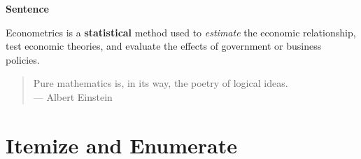 \documentclass[12pt, aspectratio=169]{beamer}
\begin{document}

\linespread{1}  %
\begin{frame}{\textbf{Sentence}}
\linespread{1.5} %
	
	 \alert{Econometrics} is a \textbf{statistical} method used to \textit{estimate} the economic relationship,
	 test economic theories, and evaluate the effects of government or business policies.
	 
	 \pause 
	
	\bigskip 
	
	\begin{quote}
		Pure mathematics is, in its way, the poetry of logical ideas.\\
		--- Albert Einstein
	\end{quote}
	
\end{frame}


\section{Itemize and Enumerate}

\end{document}
